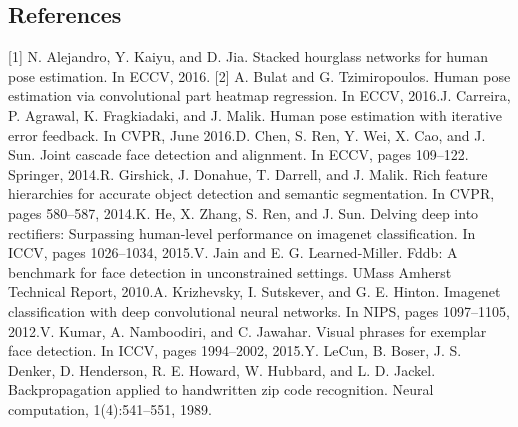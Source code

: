 \documentclass[10pt,twocolumn,letterpaper]{article}
\begin{document}
\subsection{References}
[1] N. Alejandro, Y. Kaiyu, and D. Jia. Stacked hourglass networks for human pose estimation. In ECCV, 2016.
[2] A. Bulat and G. Tzimiropoulos. Human pose estimation via
convolutional part heatmap regression. In ECCV, 2016.\newline
[3] J. Carreira, P. Agrawal, K. Fragkiadaki, and J. Malik. Human
pose estimation with iterative error feedback. In CVPR, June
2016.\newline
[4] D. Chen, S. Ren, Y. Wei, X. Cao, and J. Sun. Joint cascade face detection and alignment. In ECCV, pages 109–122.
Springer, 2014.\newline
[5] R. Girshick, J. Donahue, T. Darrell, and J. Malik. Rich feature hierarchies for accurate object detection and semantic
segmentation. In CVPR, pages 580–587, 2014.\newline
[6] K. He, X. Zhang, S. Ren, and J. Sun. Delving deep into
rectifiers: Surpassing human-level performance on imagenet
classification. In ICCV, pages 1026–1034, 2015.\newline
[7] V. Jain and E. G. Learned-Miller. Fddb: A benchmark for
face detection in unconstrained settings. UMass Amherst
Technical Report, 2010.\newline
[8] A. Krizhevsky, I. Sutskever, and G. E. Hinton. Imagenet
classification with deep convolutional neural networks. In
NIPS, pages 1097–1105, 2012.\newline
[9] V. Kumar, A. Namboodiri, and C. Jawahar. Visual phrases for exemplar face detection. In ICCV, pages 1994–2002,
2015.\newline
[10] Y. LeCun, B. Boser, J. S. Denker, D. Henderson, R. E.
Howard, W. Hubbard, and L. D. Jackel. Backpropagation
applied to handwritten zip code recognition. Neural computation, 1(4):541–551, 1989.
\end{document}
